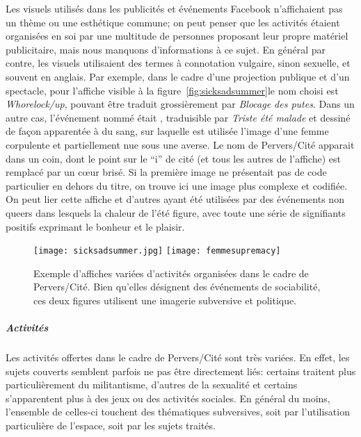 Les visuels utilisés dans les publicités et événements Facebook n'affichaient pas un thème ou une esthétique commune; on peut penser que les activités étaient organisées en soi par une multitude de personnes proposant leur propre matériel publicitaire, mais nous manquons d'informations à ce sujet.
En général par contre, les visuels utilisaient des termes à connotation vulgaire, sinon sexuelle, et souvent en anglais.
Par exemple, dans le cadre d'une projection publique et d'un spectacle, pour l'affiche visible à la figure~\ref{fig:sicksadsummer}le nom choisi est \emph{Whorelock/up}, pouvant être traduit grossièrement par \emph{Blocage des putes}.
Dans un autre cas, l'événement nommé était , traduisible par \emph{Triste été malade} et dessiné de façon apparentée à du sang, sur laquelle est utilisée l'image d'une femme corpulente et partiellement nue sous une averse.
Le nom de Pervers/Cité apparait dans un coin, dont le point sur le \enquote{i} de cité (et tous les autres de l'affiche) est remplacé par un cœur brisé.
Si la première image ne présentait pas de code particulier en dehors du titre, on trouve ici une image plus complexe et codifiée.
On peut lier cette affiche et d'autres ayant été utilisées par des événements non queers dans lesquels la chaleur de l'été figure, avec toute une série de signifiants positifs exprimant le bonheur et le plaisir.

\begin{figure}[ht]
 \centering
 {\texttt{[image: sicksadsummer.jpg]}}
 {\texttt{[image: femmesupremacy]}}
 \caption[Exemples d'affiches de Pervers/Cité]{Exemple d'affiches variées d'activités organisées dans le cadre de Pervers/Cité. Bien qu'elles désignent des événements de sociabilité, ces deux figures utilisent une imagerie subversive et politique.}\label{figs:activiteespervscite}
\end{figure}

\subparagraph{Activités}
\label{subsec:activitesperverscite}

Les activités offertes dans le cadre de Pervers/Cité sont très variées.
En effet, les sujets couverts semblent parfois ne pas être directement liés: certains traitent plus particulièrement du militantisme, d'autres de la sexualité et certains s'apparentent plus à des jeux ou des activités sociales.
En général du moins, l'ensemble de celles-ci touchent des thématiques subversives, soit par l'utilisation particulière de l'espace, soit par les sujets traités.

